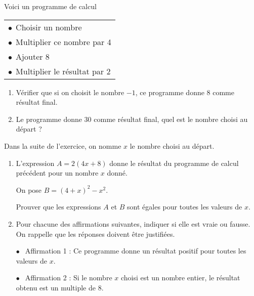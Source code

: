 
\medskip

Voici un programme de calcul \quad  \begin{tabular}{|l|}\hline
$\bullet~~$Choisir un nombre\\
$\bullet~~$Multiplier ce nombre par 4\\
$\bullet~~$Ajouter 8\\
$\bullet~~$Multiplier le résultat par 2\\ \hline
\end{tabular}

\medskip

\begin{enumerate}
\item Vérifier que si on choisit le nombre $- 1$, ce programme donne 8 comme résultat final.
\item Le programme donne 30 comme résultat final, quel est le nombre choisi au départ ?
\end{enumerate}
\smallskip

Dans la suite de l'exercice, on nomme $x$ le nombre choisi au départ.

\begin{enumerate}[resume]
\item L'expression $A = 2(4x + 8)$ donne le résultat du programme de calcul précédent pour un nombre $x$ donné.

On pose $B = (4 + x)^2 - x^2$.

Prouver que les expressions $A$ et $B$ sont égales pour toutes les valeurs de $x$.
\item Pour chacune des affirmations suivantes, indiquer si elle est vraie ou fausse. On rappelle que les réponses doivent être justifiées.

\smallskip

$\bullet~~$ Affirmation 1 : Ce programme donne un résultat positif pour toutes les valeurs de $x$.

$\bullet~~$ Affirmation 2 : Si le nombre $x$ choisi est un nombre entier, le résultat obtenu est un multiple de $8$.
\end{enumerate}

\bigskip

